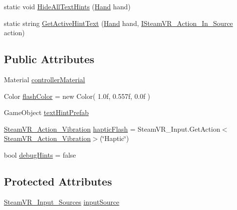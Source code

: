 \begin{DoxyCompactItemize}
\item 
static void \mbox{\hyperlink{class_valve_1_1_v_r_1_1_interaction_system_1_1_controller_button_hints_a3fb4f53e05f7feeb5c397a3747dc7a99}{Hide\+All\+Text\+Hints}} (\mbox{\hyperlink{class_valve_1_1_v_r_1_1_interaction_system_1_1_hand}{Hand}} hand)
\item 
static string \mbox{\hyperlink{class_valve_1_1_v_r_1_1_interaction_system_1_1_controller_button_hints_a17c44960af993a2fe0341ef48c7ad727}{Get\+Active\+Hint\+Text}} (\mbox{\hyperlink{class_valve_1_1_v_r_1_1_interaction_system_1_1_hand}{Hand}} hand, \mbox{\hyperlink{interface_valve_1_1_v_r_1_1_i_steam_v_r___action___in___source}{I\+Steam\+V\+R\+\_\+\+Action\+\_\+\+In\+\_\+\+Source}} action)
\end{DoxyCompactItemize}
\subsection*{Public Attributes}
\begin{DoxyCompactItemize}
\item 
Material \mbox{\hyperlink{class_valve_1_1_v_r_1_1_interaction_system_1_1_controller_button_hints_a4dadb6b679ec977c980829adfc9673fa}{controller\+Material}}
\item 
Color \mbox{\hyperlink{class_valve_1_1_v_r_1_1_interaction_system_1_1_controller_button_hints_a38b10d9b505fffc030257aac1602758f}{flash\+Color}} = new Color( 1.\+0f, 0.\+557f, 0.\+0f )
\item 
Game\+Object \mbox{\hyperlink{class_valve_1_1_v_r_1_1_interaction_system_1_1_controller_button_hints_ac3205beda1e8ea9bb2869b48d82039a5}{text\+Hint\+Prefab}}
\item 
\mbox{\hyperlink{class_valve_1_1_v_r_1_1_steam_v_r___action___vibration}{Steam\+V\+R\+\_\+\+Action\+\_\+\+Vibration}} \mbox{\hyperlink{class_valve_1_1_v_r_1_1_interaction_system_1_1_controller_button_hints_ad0fb27da7be6a805617634f7075e794a}{haptic\+Flash}} = Steam\+V\+R\+\_\+\+Input.\+Get\+Action$<$\mbox{\hyperlink{class_valve_1_1_v_r_1_1_steam_v_r___action___vibration}{Steam\+V\+R\+\_\+\+Action\+\_\+\+Vibration}}$>$(\char`\"{}Haptic\char`\"{})
\item 
bool \mbox{\hyperlink{class_valve_1_1_v_r_1_1_interaction_system_1_1_controller_button_hints_ad0dc92cbb8908e12e4dbe21c9ae18c03}{debug\+Hints}} = false
\end{DoxyCompactItemize}
\subsection*{Protected Attributes}
\begin{DoxyCompactItemize}
\item 
\mbox{\hyperlink{namespace_valve_1_1_v_r_a82e5bf501cc3aa155444ee3f0662853f}{Steam\+V\+R\+\_\+\+Input\+\_\+\+Sources}} \mbox{\hyperlink{class_valve_1_1_v_r_1_1_interaction_system_1_1_controller_button_hints_a0058edfb7a42d2c89bb8b713c1df5fca}{input\+Source}}
\end{DoxyCompactItemize}
